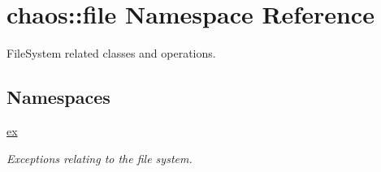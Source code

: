 \hypertarget{namespacechaos_1_1file}{}\section{chaos\+:\+:file Namespace Reference}
\label{namespacechaos_1_1file}


File\+System related classes and operations.  


\subsection*{Namespaces}
\begin{DoxyCompactItemize}
\item 
 \hyperlink{namespacechaos_1_1file_1_1ex}{ex}
\begin{DoxyCompactList}\small\item\em Exceptions relating to the file system. \end{DoxyCompactList}\end{DoxyCompactItemize}
